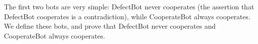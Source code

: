 \begin{code}%
\>  \AgdaSymbol{:}  \AgdaSymbol{\{}\AgdaSymbol{\}}\<%
\\
\>[0]\<[3]%
\>[3]  \AgdaSymbol{\{}      \AgdaSymbol{(} \AgdaSymbol{)\}}\<%
\\
\>[3]\<[10]%
\>[10]\AgdaSymbol{(} \AgdaSymbol{(} \AgdaSymbol{(} \AgdaSymbol{)))}\<%
\\
\>[0]\<[3]%
\>[3]  \AgdaSymbol{\{}\AgdaSymbol{\}} \<%
\\
\>  \<%
\\
\>[0]\<[3]%
\>[3]\AgdaSymbol{=} \<%
\\
\>[3]\<[5]%
\>[5]   \AgdaSymbol{(} \AgdaSymbol{(} \AgdaSymbol{))}\<%
\\
%
\\
\>  \<[16]%
\>[16]\AgdaSymbol{:}  \<%
\\
\>  \AgdaSymbol{:}  \<%
\\
\>  \<[16]%
\>[16]\AgdaSymbol{:}  \<%
\end{code}

  The first two bots are very simple: DefectBot never cooperates (the
  assertion that DefectBot cooperates is a contradiction), while
  CooperateBot always cooperates.  We define these bots, and prove
  that DefectBot never cooperates and CooperateBot always cooperates.

